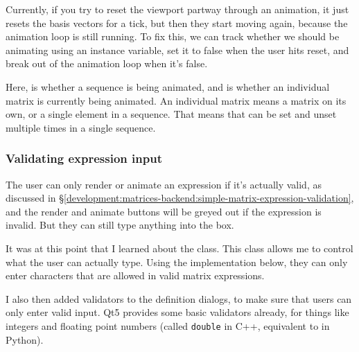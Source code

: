 \documentclass[../development.tex]{subfiles}
\begin{document}
Currently, if you try to reset the viewport partway through an animation, it just resets the basis vectors for a tick, but then they start moving again, because the animation loop is still running. To fix this, we can track whether we should be animating using an instance variable, set it to false when the user hits reset, and break out of the animation loop when it's false.



Here,  is whether a sequence is being animated, and  is whether an individual matrix is currently being animated. An individual matrix means a matrix on its own, or a single element in a sequence. That means that  can be set and unset multiple times in a single sequence.

\subsubsection{Validating expression input\label{development:fixing-bugs-and-adding-polish:validating-expression-input}}

The user can only render or animate an expression if it's actually valid, as discussed in \S\ref{development:matrices-backend:simple-matrix-expression-validation}, and the render and animate buttons will be greyed out if the expression is invalid. But they can still type anything into the box.

It was at this point that I learned about the  class\cite{qt5-docs-qvalidator}. This class allows me to control what the user can actually type. Using the implementation below, they can only enter characters that are allowed in valid matrix expressions.



I also then added validators to the definition dialogs, to make sure that users can only enter valid input. Qt5 provides some basic validators already, for things like integers and floating point numbers (called \texttt{double} in C++, equivalent to  in Python).
\end{document}
